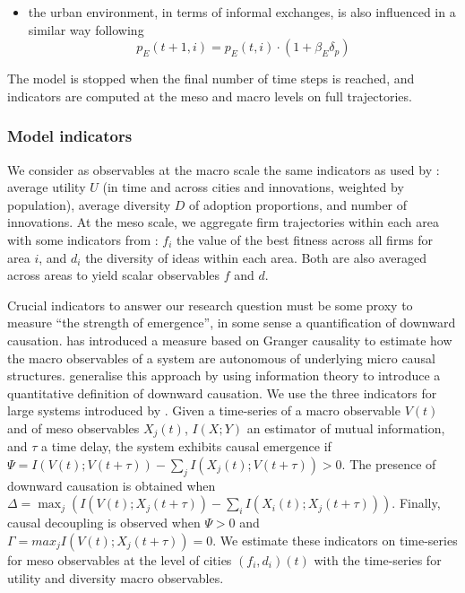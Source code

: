 \documentclass[letterpaper]{article}
\begin{document}
\begin{enumerate}
\begin{itemize}
        \item the urban environment, in terms of informal exchanges, is also influenced in a similar way following
        \[p_E(t+1,i) = p_E (t,i)\cdot (1+ \beta_E \delta_p)\]
    \end{itemize}
\end{enumerate}

The model is stopped when the final number of time steps is reached, and indicators are computed at the meso and macro levels on full trajectories.


\subsubsection{Model indicators}


We consider as observables at the macro scale the same indicators as used by \cite{raimbault2020model}: average utility $U$ (in time and across cities and innovations, weighted by population), average diversity $D$ of adoption proportions, and number of innovations. At the meso scale, we aggregate firm trajectories within each area with some indicators from \citep{raimbault2022innovation}: $f_i$ the value of the best fitness across all firms for area $i$, and $d_i$ the diversity of ideas within each area. Both are also averaged across areas to yield scalar observables $f$ and $d$.

Crucial indicators to answer our research question must be some proxy to measure ``the strength of emergence'', in some sense a quantification of downward causation. \cite{seth2010measuring} has introduced a measure based on Granger causality to estimate how the macro observables of a system are autonomous of underlying micro causal structures. \cite{rosas2020reconciling} generalise this approach by using information theory to introduce a quantitative definition of downward causation. We use the three indicators for large systems introduced by \cite{rosas2020reconciling}. Given a time-series of a macro observable $V(t)$ and of meso observables $X_j(t)$, $I(X;Y)$ an estimator of mutual information, and $\tau$ a time delay, the system exhibits causal emergence if $\Psi = I(V(t); V(t+\tau)) - \sum_j I(X_j(t) ; V(t+\tau)) > 0$. The presence of downward causation is obtained when $\Delta = \max_j \left(I(V(t) ; X_j(t+\tau)) - \sum_i I(X_i (t) ; X_j(t+\tau)) \right)$. Finally, causal decoupling is observed when $\Psi > 0$ and $\Gamma = max_j I(V(t) ; X_j (t + \tau)) = 0$. We estimate these indicators on time-series for meso observables at the level of cities $(f_i,d_i)(t)$ with the time-series for utility and diversity macro observables.
\end{document}
